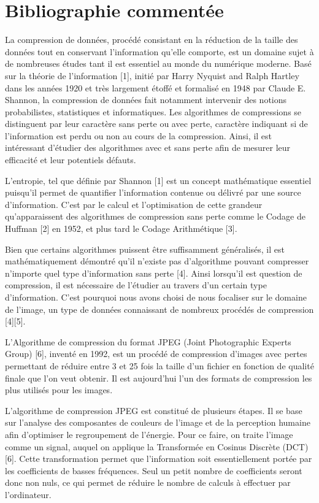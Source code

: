 \documentclass{article}
\begin{document}
\section*{Bibliographie comment\'ee}

La compression de données, procédé consistant en la réduction de la taille des données tout en conservant l'information qu'elle comporte, est un domaine sujet à de nombreuses études tant il est essentiel au monde du numérique moderne. Basé sur la théorie de l'information [1], initié par Harry Nyquist and Ralph Hartley dans les années 1920 et très largement étoffé et formalisé en 1948 par Claude E. Shannon, la compression de données fait notamment intervenir des notions probabilistes, statistiques et informatiques. Les algorithmes de compressions se distinguent par leur caractère sans perte ou avec perte, caractère indiquant si de l'information est perdu ou non au cours de la compression. Ainsi, il est intéressant d'étudier des algorithmes avec et sans perte afin de mesurer leur efficacité et leur potentiels défauts.

L'entropie, tel que définie par Shannon [1] est un concept mathématique essentiel puisqu'il permet de quantifier l'information contenue ou délivré par une source d'information. C'est par le calcul et l'optimisation de cette grandeur qu'apparaissent des algorithmes de compression sans perte comme le Codage de Huffman [2] en 1952, et plus tard le Codage Arithmétique [3].

Bien que certains algorithmes puissent être suffisamment généralisés, il est mathématiquement démontré qu'il n'existe pas d'algorithme pouvant compresser n'importe quel type d'information sans perte [4]. Ainsi lorsqu'il est question de compression, il est nécessaire de l'étudier au travers d'un certain type d'information. C'est pourquoi nous avons choisi de nous focaliser sur le domaine de l'image, un type de données connaissant de nombreux procédés de compression [4][5].

L'Algorithme de compression du format JPEG (Joint Photographic Experts Group) [6], inventé en 1992, est un procédé de compression d'images avec pertes permettant de réduire entre 3 et 25 fois la taille d'un fichier en fonction de qualité finale que l'on veut obtenir. Il est aujourd'hui l'un des formats de compression les plus utilisés pour les images.

L'algorithme de compression JPEG est constitué de plusieurs étapes. Il se base sur l'analyse des composantes de couleurs de l'image et de la perception humaine afin d'optimiser le regroupement de l'énergie. Pour ce faire, on traite l'image comme un signal, auquel on applique la Transformée en Cosinus Discrète (DCT) [6]. Cette transformation permet que l'information soit essentiellement portée par les coefficients de basses fréquences. Seul un petit nombre de coefficients seront donc non nuls, ce qui permet de réduire le nombre de calculs à effectuer par l'ordinateur.
\end{document}
